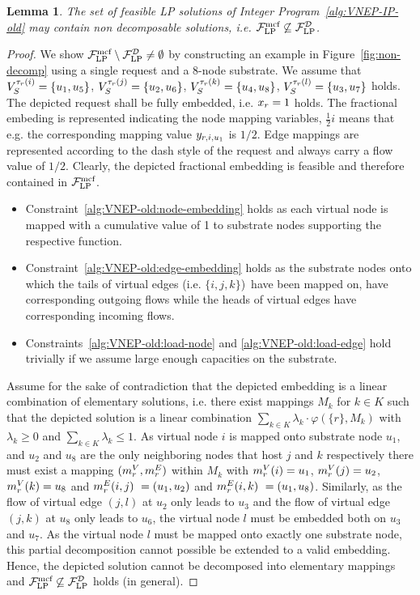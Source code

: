 \documentclass[10pt, conference, letterpaper]{IEEEtran}
\newtheorem{lemma}[theorem]{Lemma}
\begin{document}
\begin{lemma}
The set of feasible LP solutions of Integer Program~\ref{alg:VNEP-IP-old} may contain non decomposable solutions, i.e. $\spaceLP \not \subseteq \spaceLPD$.
\label{lem:non-decomposability}
\end{lemma}
\begin{proof}
We show $\spaceLP \setminus \spaceLPD \neq \emptyset$ by constructing an example in Figure~\ref{fig:non-decomp} using a single request and a 8-node substrate. We assume that $\SVTypes[\Vtype(i)] =  \{u_1,u_5\}$, $\SVTypes[\Vtype(j)] =  \{u_2,u_6\}$, $\SVTypes[\Vtype(k)] =  \{u_4,u_8\}$, $\SVTypes[\Vtype(l)] =  \{u_3,u_7\}$ holds. The depicted request shall be fully embedded, i.e. $x_{\req} = 1$ holds. The fractional embeding is represented indicating the node mapping variables, $\frac{1}{2}i$ means that e.g. the corresponding mapping value $y_{\req, i,u_1}$ is $1/2$. Edge mappings are represented according to the dash style of the request and always carry a flow value of $1/2$. Clearly, the depicted fractional embedding is feasible and therefore contained in $\spaceLP$.
\begin{itemize}
\item Constraint~\ref{alg:VNEP-old:node-embedding} holds as each virtual node is mapped with a cumulative value of 1 to substrate nodes supporting the respective function.
\item Constraint~\ref{alg:VNEP-old:edge-embedding} holds as the substrate nodes onto which the tails of virtual edges (i.e. $\{i,j,k\}$)~have been mapped on, have corresponding outgoing flows while the heads of virtual edges have corresponding incoming flows.
\item Constraints~\ref{alg:VNEP-old:load-node} and \ref{alg:VNEP-old:load-edge} hold trivially if we assume large enough capacities on the substrate.
\end{itemize}

Assume for the sake of contradiction that the depicted embedding is a linear combination of elementary solutions, i.e. there exist mappings $M_k$ for $k \in K$ such that the depicted solution is a linear combination $\sum_{k\in K} \lambda_k \cdot \varphi(\{r\}, M_k)$ with $\lambda_k \geq 0$ and $\sum_{k \in K} \lambda_k \leq 1$. As virtual node $i$ is mapped onto substrate node $u_1$, and $u_2$ and $u_8$ are the only neighboring nodes that host $j$ and $k$ respectively there must exist a mapping $(\mapV, \mapE)$ within $M_k$ with $\mapV(i)=u_1$, $\mapV(j)=u_2$, $\mapV(k)=u_8$ and $\mapE(i,j)~= (u_1,u_2)$ and $\mapE(i,k)~= (u_1,u_8)$. Similarly, as the flow of virtual edge $(j,l)$ at $u_2$ only leads to $u_3$ and the flow of virtual edge $(j,k)$ at $u_8$ only leads to $u_6$, the virtual node $l$ must be embedded both on $u_3$ and $u_7$. As the virtual node $l$ must be mapped onto exactly one substrate node, this partial decomposition cannot possible be extended to a valid embedding. Hence, the depicted solution cannot be decomposed into elementary mappings and $\spaceLP \not \subseteq \spaceLPD$ holds (in general).
\end{proof}
\end{document}
